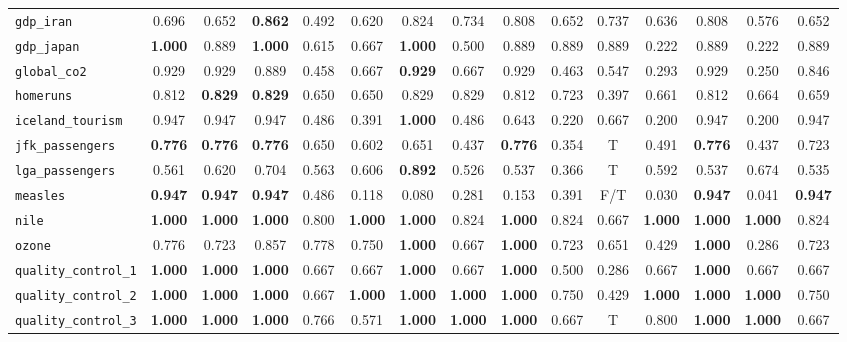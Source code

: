 \begin{tabular}{lcccccccccccccc}
\verb+gdp_iran+ & 0.696 & 0.652 & \textbf{0.862} & 0.492 & 0.620 & 0.824 & 0.734 & 0.808 & 0.652 & 0.737 & 0.636 & 0.808 & 0.576 & 0.652\\
\verb+gdp_japan+ & \textbf{1.000} & 0.889 & \textbf{1.000} & 0.615 & 0.667 & \textbf{1.000} & 0.500 & 0.889 & 0.889 & 0.889 & 0.222 & 0.889 & 0.222 & 0.889\\
\verb+global_co2+ & 0.929 & 0.929 & 0.889 & 0.458 & 0.667 & \textbf{0.929} & 0.667 & 0.929 & 0.463 & 0.547 & 0.293 & 0.929 & 0.250 & 0.846\\
\verb+homeruns+ & 0.812 & \textbf{0.829} & \textbf{0.829} & 0.650 & 0.650 & 0.829 & 0.829 & 0.812 & 0.723 & 0.397 & 0.661 & 0.812 & 0.664 & 0.659\\
\verb+iceland_tourism+ & 0.947 & 0.947 & 0.947 & 0.486 & 0.391 & \textbf{1.000} & 0.486 & 0.643 & 0.220 & 0.667 & 0.200 & 0.947 & 0.200 & 0.947\\
\verb+jfk_passengers+ & \textbf{0.776} & \textbf{0.776} & \textbf{0.776} & 0.650 & 0.602 & 0.651 & 0.437 & \textbf{0.776} & 0.354 & T & 0.491 & \textbf{0.776} & 0.437 & 0.723\\
\verb+lga_passengers+ & 0.561 & 0.620 & 0.704 & 0.563 & 0.606 & \textbf{0.892} & 0.526 & 0.537 & 0.366 & T & 0.592 & 0.537 & 0.674 & 0.535\\
\verb+measles+ & \textbf{0.947} & \textbf{0.947} & \textbf{0.947} & 0.486 & 0.118 & 0.080 & 0.281 & 0.153 & 0.391 & F/T & 0.030 & \textbf{0.947} & 0.041 & \textbf{0.947}\\
\verb+nile+ & \textbf{1.000} & \textbf{1.000} & \textbf{1.000} & 0.800 & \textbf{1.000} & \textbf{1.000} & 0.824 & \textbf{1.000} & 0.824 & 0.667 & \textbf{1.000} & \textbf{1.000} & \textbf{1.000} & 0.824\\
\verb+ozone+ & 0.776 & 0.723 & 0.857 & 0.778 & 0.750 & \textbf{1.000} & 0.667 & \textbf{1.000} & 0.723 & 0.651 & 0.429 & \textbf{1.000} & 0.286 & 0.723\\
\verb+quality_control_1+ & \textbf{1.000} & \textbf{1.000} & \textbf{1.000} & 0.667 & 0.667 & \textbf{1.000} & 0.667 & \textbf{1.000} & 0.500 & 0.286 & 0.667 & \textbf{1.000} & 0.667 & 0.667\\
\verb+quality_control_2+ & \textbf{1.000} & \textbf{1.000} & \textbf{1.000} & 0.667 & \textbf{1.000} & \textbf{1.000} & \textbf{1.000} & \textbf{1.000} & 0.750 & 0.429 & \textbf{1.000} & \textbf{1.000} & \textbf{1.000} & 0.750\\
\verb+quality_control_3+ & \textbf{1.000} & \textbf{1.000} & \textbf{1.000} & 0.766 & 0.571 & \textbf{1.000} & \textbf{1.000} & \textbf{1.000} & 0.667 & T & 0.800 & \textbf{1.000} & \textbf{1.000} & 0.667\\

\end{tabular}
